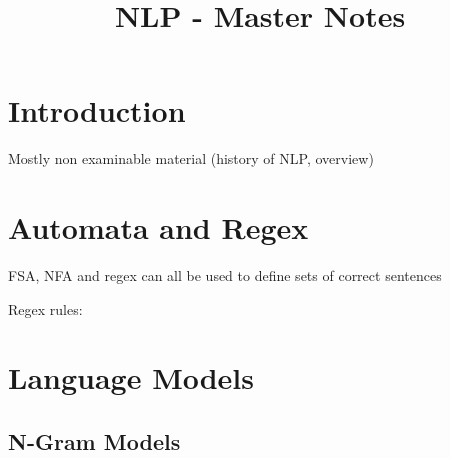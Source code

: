 \documentclass[]{article}
\title{NLP - Master Notes}
\begin{document}
	\maketitle
	
	\section{Introduction}
    
    Mostly non examinable material (history of NLP, overview)
    
	\section{Automata and Regex}
	
	FSA, NFA and regex can all be used to define sets of correct sentences
	
	Regex rules: 
	
	\section{Language Models}
	
	\subsection{N-Gram Models}
	
\end{document}
